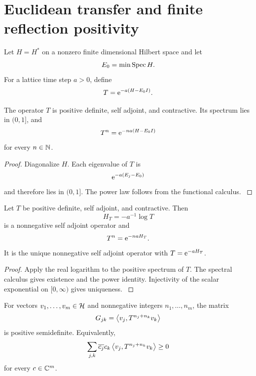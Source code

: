 \section{Euclidean transfer and finite reflection positivity}\label{strong:section:010}\label{strong:sec:euclidean}

Let \(H=H^*\) on a nonzero finite dimensional Hilbert space and let
\[
E_0=\min\operatorname{Spec} H.
\]
For a lattice time step \(a>0\), define
\[
T=\e^{-a(H-E_0I)}.
\]

\begin{theorem}\label{strong:theorem:036}\label{strong:thm:euclidean_transfer}
The operator \(T\) is positive definite, self adjoint, and contractive. Its spectrum lies in \((0,1]\), and
\[
T^n=\e^{-na(H-E_0I)}
\]
for every \(n\in\NN\).
\end{theorem}

\begin{proof}\label{strong:proof:056}
Diagonalize \(H\). Each eigenvalue of \(T\) is
\[
\e^{-a(E_j-E_0)}
\]
and therefore lies in \((0,1]\). The power law follows from the functional calculus.
\label{strong:proof:056:end}\end{proof}

\begin{theorem}\label{strong:theorem:037}\label{strong:thm:transfer_logarithm}
Let \(T\) be positive definite, self adjoint, and contractive. Then
\[
H_T=-a^{-1}\log T
\]
is a nonnegative self adjoint operator and
\[
T^n=\e^{-naH_T}.
\]
It is the unique nonnegative self adjoint operator with \(T=\e^{-aH_T}\).
\end{theorem}

\begin{proof}\label{strong:proof:057}
Apply the real logarithm to the positive spectrum of \(T\). The spectral calculus gives existence and the power identity. Injectivity of the scalar exponential on \([0,\infty)\) gives uniqueness.
\label{strong:proof:057:end}\end{proof}

\begin{theorem}\label{strong:theorem:038}\label{strong:thm:finite_reflection_positivity}
For vectors \(v_1,\ldots,v_m\in\Hcal\) and nonnegative integers \(n_1,\ldots,n_m\), the matrix
\[
G_{jk}=\left\langle v_j,T^{n_j+n_k}v_k\right\rangle
\]
is positive semidefinite. Equivalently,
\[
\sum_{j,k}\overline{c_j}c_k
\left\langle v_j,T^{n_j+n_k}v_k\right\rangle
\geq0
\]
for every \(c\in\CC^m\).
\end{theorem}


